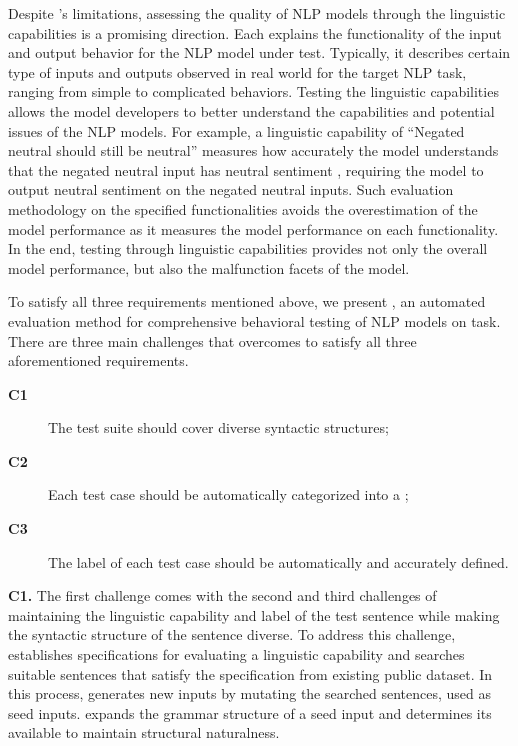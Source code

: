 Despite \Cklst's limitations, assessing the quality of NLP models
through the linguistic capabilities is a promising direction. Each \lc
explains the functionality of the input and output behavior for the
NLP model under test. Typically, it describes certain type of inputs
and outputs observed in real world for the target NLP task, ranging
from simple to complicated behaviors. Testing the linguistic capabilities allows the model developers to better understand the capabilities and potential issues of the NLP
models. For example, a linguistic capability of ``Negated neutral
should still be neutral'' measures how accurately the \sa model
understands that the negated neutral input has neutral sentiment
\cite{marcoACL2020checklist}, requiring the \sa model to
output neutral sentiment on the negated neutral inputs.  Such evaluation
methodology on the specified functionalities avoids the
overestimation of the model performance as it measures
the model performance on each functionality.
In the end, testing through linguistic capabilities provides not only
the overall model performance, but also the malfunction facets of the
model.

To satisfy all three requirements mentioned above, we present \tool,
an automated evaluation method for comprehensive behavioral
testing of NLP models on \sa task.  There are three main challenges
that \tool overcomes to satisfy all three aforementioned requirements.
\begin{description}
\item[{\bf C1}] The test suite should cover diverse syntactic structures;
\item[{\bf C2}] Each test case should be automatically categorized into a \lc;
\item[{\bf C3}] The label of each test case should be automatically
  and accurately defined.
\end{description}

\noindent \textbf{C1.} The first challenge comes with the second and third challenges of maintaining the linguistic capability and label of the test sentence while making the syntactic structure of the sentence diverse. 
To address this challenge, \tool establishes specifications for evaluating
a linguistic capability and searches suitable sentences that satisfy
the specification from existing public dataset. In this process, \tool
generates new inputs by mutating the searched sentences, used as seed
inputs. \tool expands the grammar structure of a seed input and determines its
available \pos to maintain structural naturalness.

